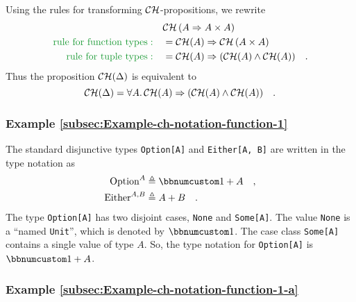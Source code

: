 Using the rules for transforming ${\cal CH}$-propositions, we rewrite
\begin{align*}
 & {\cal CH}\left(A\Rightarrow A\times A\right)\\
{\color{greenunder}\text{rule for function types}:}\quad & ={\cal CH}(A)\Rightarrow{\cal CH}\left(A\times A\right)\\
{\color{greenunder}\text{rule for tuple types}:}\quad & ={\cal CH}(A)\Rightarrow({\cal CH}(A)\wedge{\cal CH}(A))\quad.
\end{align*}
Thus the proposition ${\cal CH}(\Delta)$ is equivalent to
\[
{\cal CH}(\Delta)=\forall A.\,{\cal CH}(A)\Rightarrow({\cal CH}(A)\wedge{\cal CH}(A))\quad.
\]


\subsubsection{Example \label{subsec:Example-ch-notation-function-1}\ref{subsec:Example-ch-notation-function-1}}

The standard disjunctive types \lstinline!Option[A]!
and \lstinline!Either[A, B]!
are written in the type notation as
\begin{align*}
\text{Option}^{A} & \triangleq\bbnum 1+A\quad,\\
\text{Either}^{A,B} & \triangleq A+B\quad.
\end{align*}
The type \lstinline!Option[A]!
has two disjoint cases, \lstinline!None!
and \lstinline!Some[A]!.
The value \lstinline!None!
is a ``named \lstinline!Unit!'',
which is denoted by $\bbnum 1$. The case class \lstinline!Some[A]!
contains a single value of type $A$. So, the type notation for \lstinline!Option[A]!
is $\bbnum 1+A$.

\subsubsection{Example \label{subsec:Example-ch-notation-function-1-a}\ref{subsec:Example-ch-notation-function-1-a}}

